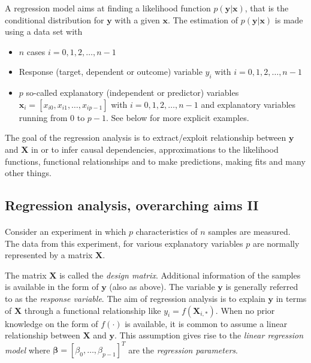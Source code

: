 \documentclass[%
oneside,                 %
final,                   %
10pt]{article}
\begin{document}
A regression model aims at finding a likelihood function $p(\bm{y}\vert \bm{x})$, that is the conditional distribution for $\bm{y}$ with a given $\bm{x}$. The estimation of  $p(\bm{y}\vert \bm{x})$ is made using a data set with 
\begin{itemize}
\item $n$ cases $i = 0, 1, 2, \dots, n-1$ 

\item Response (target, dependent or outcome) variable $y_i$ with $i = 0, 1, 2, \dots, n-1$ 

\item $p$ so-called explanatory (independent or predictor) variables $\bm{x}_i=[x_{i0}, x_{i1}, \dots, x_{ip-1}]$ with $i = 0, 1, 2, \dots, n-1$ and explanatory variables running from $0$ to $p-1$. See below for more explicit examples.   
\end{itemize}

\noindent
 The goal of the regression analysis is to extract/exploit relationship between $\bm{y}$ and $\bm{X}$ in or to infer causal dependencies, approximations to the likelihood functions, functional relationships and to make predictions, making fits and many other things.



\subsection{Regression analysis, overarching aims II}

\paragraph{}


Consider an experiment in which $p$ characteristics of $n$ samples are
measured. The data from this experiment, for various explanatory variables $p$ are normally represented by a matrix  
$\mathbf{X}$.

The matrix $\mathbf{X}$ is called the \emph{design
matrix}. Additional information of the samples is available in the
form of $\bm{y}$ (also as above). The variable $\bm{y}$ is
generally referred to as the \emph{response variable}. The aim of
regression analysis is to explain $\bm{y}$ in terms of
$\bm{X}$ through a functional relationship like $y_i =
f(\mathbf{X}_{i,\ast})$. When no prior knowledge on the form of
$f(\cdot)$ is available, it is common to assume a linear relationship
between $\bm{X}$ and $\bm{y}$. This assumption gives rise to
the \emph{linear regression model} where $\bm{\beta} = [\beta_0, \ldots,
\beta_{p-1}]^{T}$ are the \emph{regression parameters}. 
\end{document}
